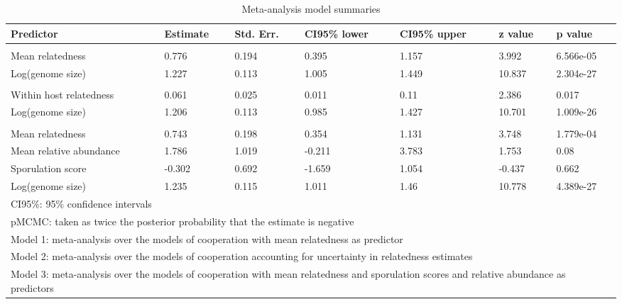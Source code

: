 \begin{table}

\caption{\label{tab:}Meta-analysis model summaries}
\centering
\begin{tabular}[t]{lllllll}
\toprule
Predictor & Estimate & Std. Err. & CI95\% lower & CI95\% upper & z value & p value\\
\midrule
\addlinespace[0.3em]
\multicolumn{7}{l}{\textbf{Model 1}}\\
\hspace{1em}Mean relatedness & 0.776 & 0.194 & 0.395 & 1.157 & 3.992 & 6.566e-05\\
\hspace{1em}Log(genome size) & 1.227 & 0.113 & 1.005 & 1.449 & 10.837 & 2.304e-27\\
\addlinespace[0.3em]
\multicolumn{7}{l}{\textbf{Model 2}}\\
\hspace{1em}Within host relatedness & 0.061 & 0.025 & 0.011 & 0.11 & 2.386 & 0.017\\
\hspace{1em}Log(genome size) & 1.206 & 0.113 & 0.985 & 1.427 & 10.701 & 1.009e-26\\
\addlinespace[0.3em]
\multicolumn{7}{l}{\textbf{Model 3}}\\
\hspace{1em}Mean relatedness & 0.743 & 0.198 & 0.354 & 1.131 & 3.748 & 1.779e-04\\
\hspace{1em}Mean relative abundance & 1.786 & 1.019 & -0.211 & 3.783 & 1.753 & 0.08\\
\hspace{1em}Sporulation score & -0.302 & 0.692 & -1.659 & 1.054 & -0.437 & 0.662\\
\hspace{1em}Log(genome size) & 1.235 & 0.115 & 1.011 & 1.46 & 10.778 & 4.389e-27\\
\bottomrule
\multicolumn{7}{l}{\rule{0pt}{1em}CI95\%: 95\% confidence intervals}\\
\multicolumn{7}{l}{\rule{0pt}{1em}pMCMC: taken as twice the posterior probability that the estimate is negative}\\
\multicolumn{7}{l}{\rule{0pt}{1em}Model 1: meta-analysis over the models of cooperation with mean relatedness as predictor}\\
\multicolumn{7}{l}{\rule{0pt}{1em}Model 2: meta-analysis over the models of cooperation accounting for uncertainty in relatedness estimates}\\
\multicolumn{7}{l}{\rule{0pt}{1em}Model 3: meta-analysis over the models of cooperation with mean relatedness and sporulation scores and relative abundance as predictors}\\
\end{tabular}
\end{table}
